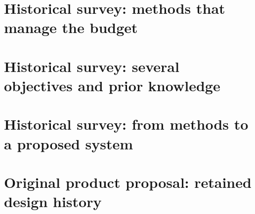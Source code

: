 \documentclass[11pt]{report}
\begin{document}
\part{Historical survey: methods that manage the budget}



\part{Historical survey: several objectives and prior knowledge}



\part{Historical survey: from methods to a proposed system}



\part{Original product proposal: retained design history}







\clearpage

\end{document}
